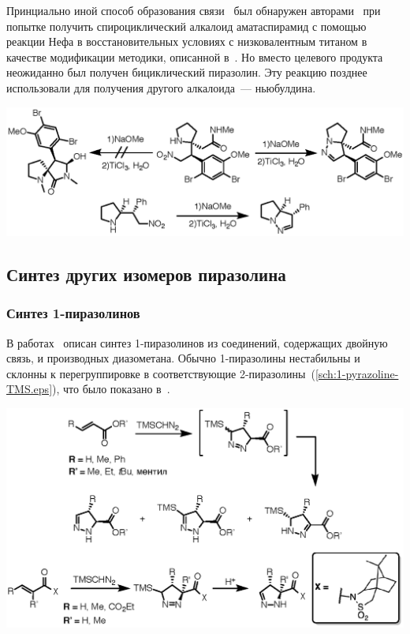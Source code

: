 Принциально иной способ образования связи~ был обнаружен авторами~\cite{Pangerl2010} при попытке получить спироциклический алкалоид аматаспирамид с помощью реакции Нефа в восстановительных условиях с низковалентным титаном в качестве модификации методики, описанной в~\cite{Hughes2002a}.
Но вместо целевого продукта неожиданно был получен бициклический пиразолин. 
Эту реакцию позднее использовали для получения другого алкалоида~--- ньюбулдина.

\begin{scheme}[h!]
    \centering
    \includegraphics{sections/literature/img/reductiveNN.eps}
    \caption{}
    \label{sch:reductiveNN}
\end{scheme}

\FloatBarrier{}

\subsection{Синтез других изомеров пиразолина}

\subsubsection{Синтез 1-пиразолинов}
В работах~\cite{Baldwin1990, Mish1997, Simovic2007, Sun2013} описан синтез 1-пиразолинов из соединений, содержащих двойную связь, и производных диазометана.
Обычно 1-пиразолины нестабильны и склонны к перегруппировке в соответствующие 2-пиразолины~(\ref{sch:1-pyrazoline-TMS.eps}), что было показано в~\cite{Mish1997, Simovic2007}.

\begin{scheme}[h!]
    \centering
    \includegraphics{sections/literature/img/1-pyrazoline-TMS.eps}
    \caption{}
    \label{sch:1-pyrazoline-TMS.eps}
\end{scheme}

